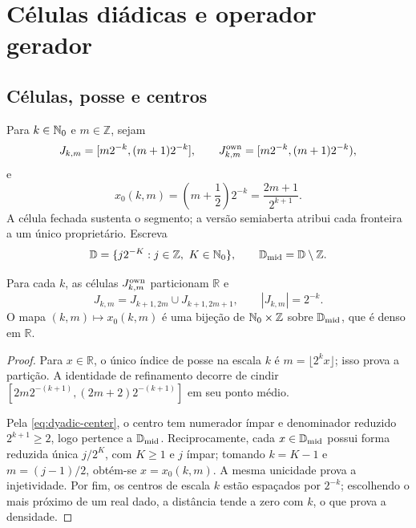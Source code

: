 \section{Células diádicas e operador gerador}
\label{sec:generator}

\subsection{Células, posse e centros}

Para $k\in\mathbb{N}_0$ e $m\in\mathbb{Z}$, sejam
\begin{equation}
 J_{k,m}=[m2^{-k},(m+1)2^{-k}],\qquad
 J_{k,m}^{\mathrm{own}}=[m2^{-k},(m+1)2^{-k}),
 \label{eq:dyadic-cells}
\end{equation}
e
\begin{equation}
 x_0(k,m)=\left(m+\frac12\right)2^{-k}=\frac{2m+1}{2^{k+1}}.
 \label{eq:dyadic-center}
\end{equation}
A célula fechada sustenta o segmento; a versão semiaberta atribui cada fronteira a um único proprietário. Escreva
\[
 \mathbb{D}=\{j2^{-K}:j\in\mathbb{Z},\ K\in\Nzero\},\qquad
 \Dmid=\mathbb{D}\setminus\mathbb{Z}.
\]

\begin{lemma}\label{lem:dyadic}
Para cada $k$, as células $J_{k,m}^{\mathrm{own}}$ particionam $\mathbb{R}$ e
\begin{equation}
 J_{k,m}=J_{k+1,2m}\cup J_{k+1,2m+1},\qquad |J_{k,m}|=2^{-k}.
 \label{eq:refinement}
\end{equation}
O mapa $(k,m)\mapsto x_0(k,m)$ é uma bijeção de $\mathbb{N}_0\times\mathbb{Z}$ sobre $\mathbb{D}_{\mathrm{mid}}$, que é denso em $\mathbb{R}$.
\end{lemma}

\begin{proof}
Para $x\in\mathbb{R}$, o único índice de posse na escala $k$ é $m=\lfloor2^kx\rfloor$; isso prova a partição. A identidade de refinamento decorre de cindir $[2m2^{-(k+1)},(2m+2)2^{-(k+1)}]$ em seu ponto médio.

Pela \eqref{eq:dyadic-center}, o centro tem numerador ímpar e denominador reduzido $2^{k+1}\ge2$, logo pertence a $\mathbb{D}_{\mathrm{mid}}$. Reciprocamente, cada $x\in\mathbb{D}_{\mathrm{mid}}$ possui forma reduzida única $j/2^K$, com $K\ge1$ e $j$ ímpar; tomando $k=K-1$ e $m=(j-1)/2$, obtém-se $x=x_0(k,m)$. A mesma unicidade prova a injetividade. Por fim, os centros de escala $k$ estão espaçados por $2^{-k}$; escolhendo o mais próximo de um real dado, a distância tende a zero com $k$, o que prova a densidade.
\end{proof}

